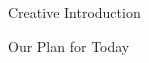 
\begin{frame}[c]{Creative Introduction}

\end{frame}

\begin{frame}{Our Plan for Today}
    \tableofcontents
\end{frame}